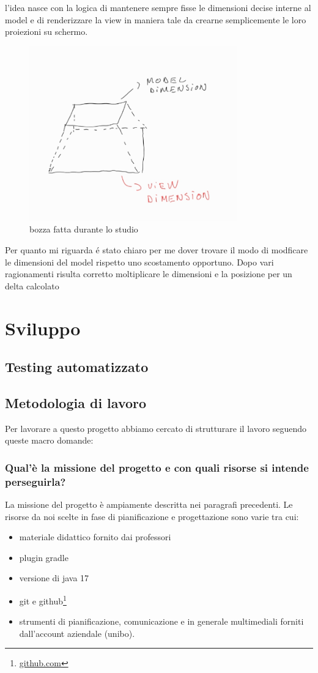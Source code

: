 \documentclass[a4paper,12pt]{report}
\begin{document}
l'idea nasce con la logica di mantenere sempre fisse le dimensioni decise interne al model
e di renderizzare la view in maniera tale da crearne semplicemente le loro proiezioni su schermo.
\begin{figure}[H]
    \centering
    \includegraphics[width=0.8\textwidth]{images/projection.jpg}
    \caption{bozza fatta durante lo studio}
\end{figure}
Per quanto mi riguarda é stato chiaro per me dover trovare il modo di modficare le dimensioni del model rispetto
uno scostamento opportuno.
Dopo vari ragionamenti risulta corretto moltiplicare le dimensioni e la posizione per un delta calcolato

\chapter{Sviluppo}
\section{Testing automatizzato}
\section{Metodologia di lavoro}
Per lavorare
a questo progetto abbiamo cercato di strutturare il lavoro seguendo queste macro domande:
\subsection{Qual'è la missione del progetto e con quali risorse si intende perseguirla?}
La missione del progetto è ampiamente descritta nei paragrafi precedenti.
Le risorse da noi scelte in fase di pianificazione e progettazione sono varie tra cui:
\begin{itemize}
    \item materiale didattico fornito dai professori
    \item plugin gradle
    \item versione di java 17
    \item git e github\footnote{\url{github.com}}
    \item strumenti di pianificazione, comunicazione e in generale multimediali forniti dall'account aziendale (unibo).
\end{itemize}
\end{document}
